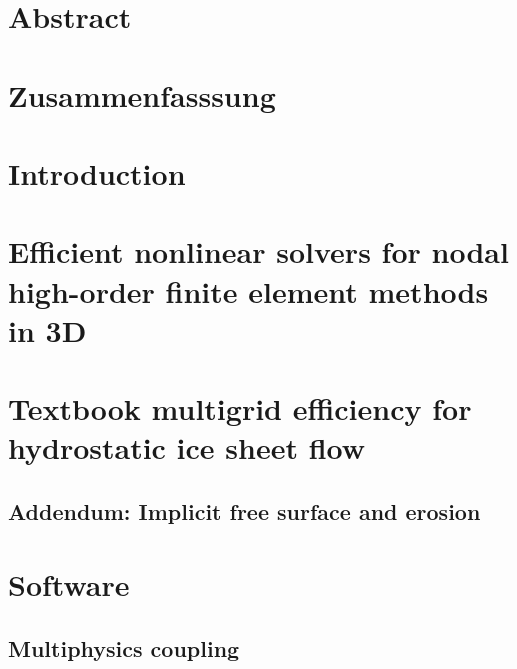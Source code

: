\documentclass[a4paper,twoside,11pt,pdftex]{report}
\begin{document}
\pagestyle{plain}


\cleardoublepage

\tableofcontents
\listoffigures
\listoftables

\chapter*{Abstract}
\thispagestyle{contents}
\label{sec:abstract}


\chapter*{Zusammenfasssung}
\thispagestyle{contents}

\cleardoublepage

\setcounter{page}{1}
\pagestyle{body}

\chapter{Introduction}\label{sec:introduction}


\chapter{Efficient nonlinear solvers for nodal high-order finite element methods in 3D}\label{chap:dohp}

\cleardoublepage

\chapter{Textbook multigrid efficiency for hydrostatic ice sheet flow}\label{chap:tme-ice}

\section{Addendum: Implicit free surface and erosion}\label{sec:tmeiceaddendum}


\cleardoublepage
\chapter{Software}\label{chap:software}

\section{Multiphysics coupling}\label{sec:multiphysics}

\end{document}
